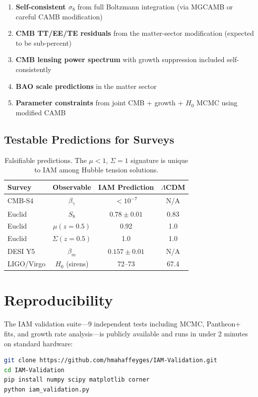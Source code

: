 \documentclass[11pt,letterpaper]{article}
\begin{document}
\begin{enumerate}
\item \textbf{Self-consistent $\sigma_8$} from full Boltzmann integration (via MGCAMB or careful CAMB modification)
\item \textbf{CMB TT/EE/TE residuals} from the matter-sector modification (expected to be sub-percent)
\item \textbf{CMB lensing power spectrum} with growth suppression included self-consistently
\item \textbf{BAO scale predictions} in the matter sector
\item \textbf{Parameter constraints} from joint CMB + growth + $H_0$ MCMC using modified CAMB
\end{enumerate}

\subsection{Testable Predictions for Surveys}

\begin{table}[h]
\centering
\begin{tabular}{lccc}
\toprule
Survey & Observable & IAM Prediction & $\Lambda$CDM \\
\midrule
CMB-S4 & $\beta_\gamma$ & $< 10^{-7}$ & N/A \\
Euclid & $S_8$ & $0.78 \pm 0.01$ & 0.83 \\
Euclid & $\mu(z=0.5)$ & 0.92 & 1.0 \\
Euclid & $\Sigma(z=0.5)$ & 1.0 & 1.0 \\
DESI Y5 & $\beta_m$ & $0.157 \pm 0.01$ & N/A \\
LIGO/Virgo & $H_0$ (sirens) & 72--73 & 67.4 \\
\bottomrule
\end{tabular}
\caption{Falsifiable predictions. The $\mu < 1$, $\Sigma = 1$ signature is unique to IAM among Hubble tension solutions.}
\end{table}

\section{Reproducibility}

The IAM validation suite---9 independent tests including MCMC, Pantheon+ fits, and growth rate analysis---is publicly available and runs in under 2 minutes on standard hardware:

\begin{lstlisting}[language=bash]
git clone https://github.com/hmahaffeyges/IAM-Validation.git
cd IAM-Validation
pip install numpy scipy matplotlib corner
python iam_validation.py
\end{lstlisting}
\end{document}
